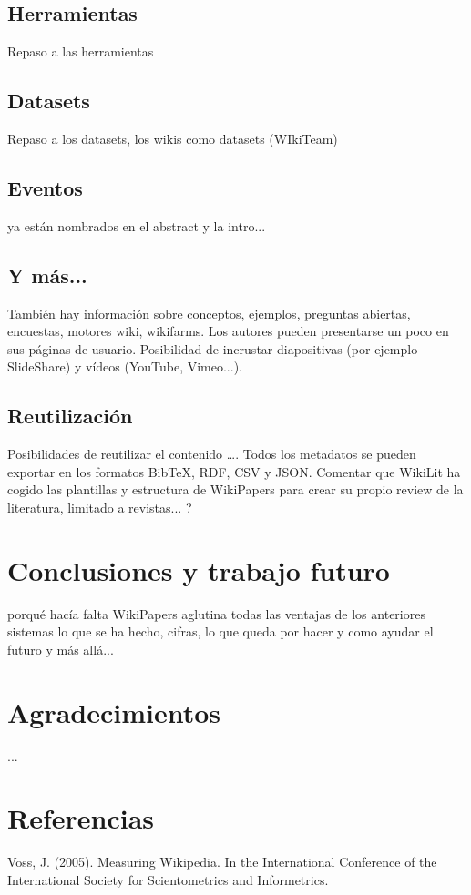 \documentclass[11pt,twocolumn]{article}
\begin{document}
\subsection{Herramientas}
Repaso a las herramientas

\subsection{Datasets}
Repaso a los datasets, los wikis como datasets (WIkiTeam)

\subsection{Eventos}
ya están nombrados en el abstract y la intro...

\subsection{Y más...}
También hay información sobre conceptos, ejemplos, preguntas abiertas, encuestas, motores wiki, wikifarms.
Los autores pueden presentarse un poco en sus páginas de usuario.
Posibilidad de incrustar diapositivas (por ejemplo SlideShare) y vídeos (YouTube, Vimeo...).

\subsection{Reutilización}
Posibilidades de reutilizar el contenido ….
Todos los metadatos se pueden exportar en los formatos BibTeX, RDF, CSV y JSON.
Comentar que WikiLit ha cogido las plantillas y estructura de WikiPapers para crear su propio review de la literatura, limitado a revistas... ?

\section{Conclusiones y trabajo futuro}
porqué hacía falta WikiPapers
aglutina todas las ventajas de los anteriores sistemas
lo que se ha hecho, cifras,
lo que queda por hacer y como ayudar
el futuro y más allá...

\section{Agradecimientos}
...

\section{Referencias}
Voss, J. (2005). Measuring Wikipedia. In the International Conference of the International Society for Scientometrics and Informetrics.
\end{document}
